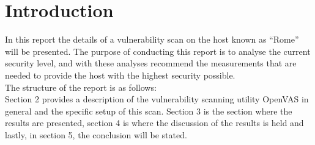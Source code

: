 \section{Introduction} \label{sec:intro}

In this report the details of a vulnerability scan on the host known as “Rome” will be presented.
The purpose of conducting this report is to analyse the current security level, and with these analyses recommend the measurements that are needed to provide the host with the highest security possible. \\

\noindent The structure of the report is as follows: \\
Section 2 provides a description of the vulnerability scanning utility OpenVAS in general and the specific setup of this scan. Section 3 is the section where the results are presented, section 4 is where the discussion of the results is held and lastly, in section 5, the conclusion will be stated.